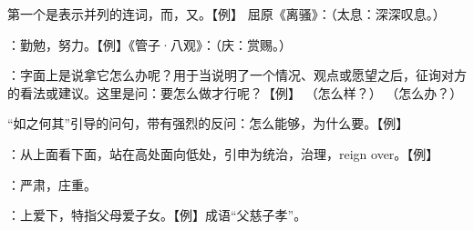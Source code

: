 {
\item {}第一个是表示并列的连词，而，又。【例】 屈原《离骚》：（太息：深深叹息。）
\item {}：勤勉，努力。【例】《管子·八观》：（庆：赏赐。）
\item {}：字面上是说拿它怎么办呢？用于当说明了一个情况、观点或愿望之后，征询对方的看法或建议。这里是问：要怎么做才行呢？【例】 （怎么样？） （怎么办？）

“如之何其”引导的问句，带有强烈的反问：怎么能够，为什么要。【例】 
\item {}：从上面看下面，站在高处面向低处，引申为统治，治理，reign over。【例】 
\item {}：严肃，庄重。
\item {}：上爱下，特指父母爱子女。【例】成语“父慈子孝”。
}
{}


